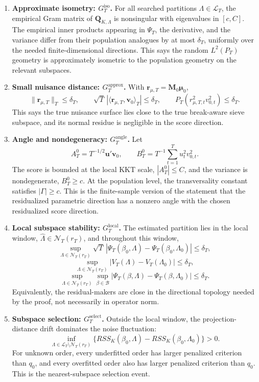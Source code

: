 \documentclass[12pt]{article}
\numberwithin{equation}{section}
\theoremstyle{definition}
\newcommand{\innerT}[2]{\langle #1,#2\rangle_T}
\begin{document}
\begin{enumerate}[leftmargin=2em]
\item \textbf{Approximate isometry: \(G_T^{\mathrm{iso}}\).} For all searched
partitions \(\Lambda\in\mathcal L_T\), the empirical Gram matrix of
\(\bm Q_{K,\Lambda}\) is nonsingular with eigenvalues in \([c,C]\). The empirical
inner products appearing in \(\Psi_T\), the derivative, and the variance differ
from their population analogues by at most \(\delta_T\), uniformly over the
needed finite-dimensional directions. This says the random \(L^2(P_T)\) geometry
is approximately isometric to the population geometry on the relevant subspaces.

\item \textbf{Small nuisance distance: \(G_T^{\mathrm{approx}}\).} With
\(\bm r_{\mu,T}=\bm M_0\bm\mu_0\),
\[
    \|\bm r_{\mu,T}\|_T\le \delta_T,
    \qquad
    \sqrt T\,|\innerT{\bm r_{\mu,T}}{\bm v_0}|\le \delta_T,
    \qquad
    P_T(r_{\mu,T,t}^2v_{0,t}^2)\le \delta_T.
\]
This says the true nuisance surface lies close to the true break-aware sieve
subspace, and its normal residue is negligible in the score direction.

\item \textbf{Angle and nondegeneracy: \(G_T^{\mathrm{angle}}\).} Let
\[
    A_T^0=T^{-1/2}\bm u'\bm v_0,
    \qquad
    B_T^0=T^{-1}\sum_{t=1}^T u_t^2v_{0,t}^2.
\]
The score is bounded at the local KKT scale, \(|A_T^0|\le C\), and the variance
is nondegenerate, \(B_T^0\ge c\). At the population level, the transversality
constant satisfies \(|\Gamma|\ge c\). This is the finite-sample version of the
statement that the residualized parametric direction has a nonzero angle with
the chosen residualized score direction.

\item \textbf{Local subspace stability: \(G_T^{\mathrm{local}}\).} The estimated
partition lies in the local window, \(\widehat\Lambda\in\mathcal N_T(r_T)\), and
throughout this window,
\[
    \sup_{\Lambda\in\mathcal N_T(r_T)}
    \sqrt T\,|\Psi_T(\beta_0,\Lambda)-\Psi_T(\beta_0,\Lambda_0)|\le\delta_T,
\]
\[
    \sup_{\Lambda\in\mathcal N_T(r_T)}
    |V_T(\Lambda)-V_T(\Lambda_0)|\le\delta_T,
\]
\[
    \sup_{\Lambda\in\mathcal N_T(r_T)}\sup_{\beta\in\mathcal B}
    |\Psi_T(\beta,\Lambda)-\Psi_T(\beta,\Lambda_0)|\le\delta_T.
\]
Equivalently, the residual-makers are close in the directional topology needed
by the proof, not necessarily in operator norm.

\item \textbf{Subspace selection: \(G_T^{\mathrm{select}}\).} Outside the local
window, the projection-distance drift dominates the noise fluctuation:
\[
    \inf_{\Lambda\in\mathcal L_T\setminus\mathcal N_T(r_T)}
    \{RSS_K(\beta_0,\Lambda)-RSS_K(\beta_0,\Lambda_0)\}>0.
\]
For unknown order, every underfitted order has larger penalized criterion than
\(q_0\), and every overfitted order also has larger penalized criterion than
\(q_0\). This is the nearest-subspace selection event.


\end{enumerate}
\end{document}
